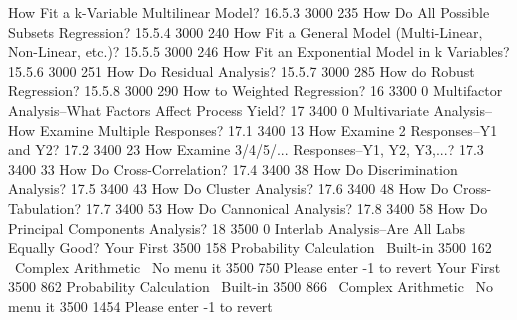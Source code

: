 How Fit a k-Variable Multilinear Model?
16.5.3          3000       235
How Do All Possible Subsets Regression?
15.5.4          3000       240
How Fit a General Model (Multi-Linear, Non-Linear, etc.)?
15.5.5          3000       246
How Fit an Exponential Model in k Variables?
15.5.6          3000       251
How Do Residual Analysis?
15.5.7          3000       285
How do Robust Regression?
15.5.8          3000       290
How to Weighted Regression?
16              3300         0
Multifactor Analysis--What Factors Affect Process Yield?
17              3400         0
Multivariate Analysis--How Examine Multiple Responses?
17.1            3400        13
How Examine 2 Responses--Y1 and Y2?
17.2            3400        23
How Examine 3/4/5/... Responses--Y1, Y2, Y3,...?
17.3            3400        33
How Do Cross-Correlation?
17.4            3400        38
How Do Discrimination Analysis?
17.5            3400        43
How Do Cluster Analysis?
17.6            3400        48
How Do Cross-Tabulation?
17.7            3400        53
How Do Cannonical Analysis?
17.8            3400        58
How Do Principal Components Analysis?
18              3500         0
Interlab Analysis--Are All Labs Equally Good?
Your First      3500       158
Probability Calculation
~Built-in       3500       162
~Complex Arithmetic~
No menu it      3500       750
Please enter -1 to revert
Your First      3500       862
Probability Calculation
~Built-in       3500       866
~Complex Arithmetic~
No menu it      3500      1454
Please enter -1 to revert
 
 
 
 
 
 
 
 
 
 
 
 
 
 
 
 
 
 
 
 
 
 
 
 
 
 
 
 
 
 
 
 
 
 
 
 
 
 
 
 
 
 
 
 
 
 
 
 
 

